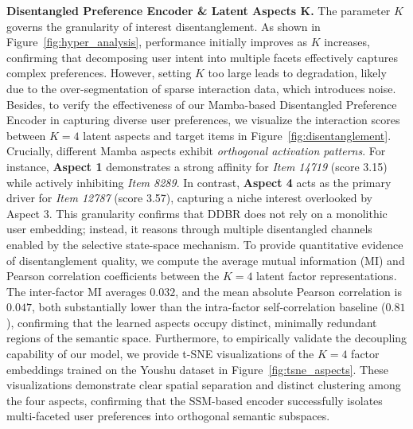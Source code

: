 \documentclass[lettersize,journal]{IEEEtran}
\begin{document}
\noindent \textbf{Disentangled Preference Encoder \& Latent Aspects K.}
The parameter $K$ governs the granularity of interest disentanglement. As shown in Figure~\ref{fig:hyper_analysis}, performance initially improves as $K$ increases, confirming that decomposing user intent into multiple facets effectively captures complex preferences. However, setting $K$ too large leads to degradation, likely due to the over-segmentation of sparse interaction data, which introduces noise. Besides, to verify the effectiveness of our Mamba-based Disentangled Preference Encoder in capturing diverse user preferences, we visualize the interaction scores between $K=4$ latent aspects and target items in Figure~\ref{fig:disentanglement}. Crucially, different Mamba aspects exhibit \textit{orthogonal activation patterns}. For instance, \textbf{Aspect 1} demonstrates a strong affinity for \textit{Item 14719} (score 3.15) while actively inhibiting \textit{Item 8289}. In contrast, \textbf{Aspect 4} acts as the primary driver for \textit{Item 12787} (score 3.57), capturing a niche interest overlooked by Aspect 3. This granularity confirms that DDBR does not rely on a monolithic user embedding; instead, it reasons through multiple disentangled channels enabled by the selective state-space mechanism. To provide quantitative evidence of disentanglement quality, we compute the average mutual information (MI) and Pearson correlation coefficients between the $K=4$ latent factor representations. The inter-factor MI averages $0.032$, and the mean absolute Pearson correlation is $0.047$, both substantially lower than the intra-factor self-correlation baseline ($0.81$), confirming that the learned aspects occupy distinct, minimally redundant regions of the semantic space. Furthermore, to empirically validate the decoupling capability of our model, we provide t-SNE visualizations of the $K=4$ factor embeddings trained on the Youshu dataset in Figure~\ref{fig:tsne_aspects}. These visualizations demonstrate clear spatial separation and distinct clustering among the four aspects, confirming that the SSM-based encoder successfully isolates multi-faceted user preferences into orthogonal semantic subspaces.
\end{document}
